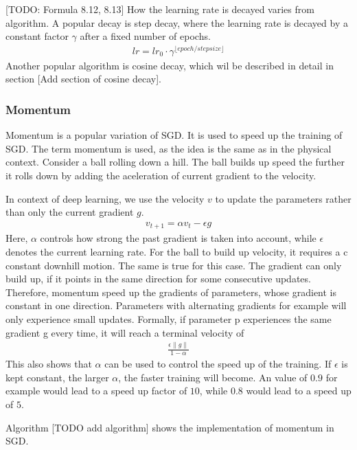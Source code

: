[TODO: Formula 8.12, 8.13] How the learning rate is decayed varies from
algorithm. A popular decay is step decay, where the learning rate is decayed by
a constant factor $\gamma$ after a fixed number of epochs.
\begin{align}
    lr = lr_0 \cdot \gamma^{\lfloor epoch/stepsize \rfloor}
\end{align}
Another popular algorithm is cosine decay, which wil be described in detail in
section [Add section of cosine decay].

\subsubsection{Momentum}
Momentum is a popular variation of SGD. It is used to speed up the training of
SGD. The term momentum is used, as the idea is the same as in the physical
context. Consider a ball rolling down a hill. The ball builds up speed the
further it rolls down by adding the aceleration of current gradient to the
velocity.

In context of deep learning, we use the velocity $v$ to update the parameters
rather than only the current gradient $g$.
\begin{align}
    v_{t+1}=\alpha v_t - \epsilon g
\end{align}
Here, $\alpha$ controls how strong the past gradient is taken into account,
while $\epsilon$ denotes the current learning rate. For the ball to build up
velocity, it requires a c constant downhill motion. The same is true for this
case. The gradient can only build up, if it points in the same direction for
some consecutive updates. Therefore, momentum speed up the gradients of
parameters, whose gradient is constant in one direction. Parameters with
alternating gradients for example will only experience small updates. Formally,
if parameter p experiences the same gradient g every time, it will reach a
terminal velocity of
\begin{align}
    \frac{\epsilon \lVert g \rVert}{1-\alpha}
\end{align}
This also shows that $\alpha$ can be used to control the speed up of the
training. If $\epsilon$ is kept constant, the larger $\alpha$, the faster
training will become. An value of $0.9$ for example would lead to a speed up
factor of $10$, while $0.8$ would lead to a speed up of $5$.

Algorithm [TODO add algorithm] shows the implementation of momentum in SGD.





